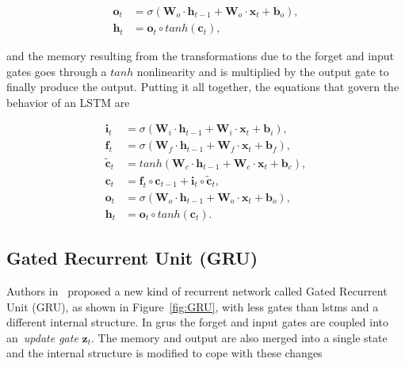 \begin{equation}\label{eq:LSTM_output_gate}
\begin{split}
\mathbf{o}_t &= \sigma\left(\mathbf{W}_o \cdot \mathbf{h}_{t-1} +
\mathbf{W}_o \cdot \mathbf{x}_t + \mathbf{b}_o \right),\\
\mathbf{h}_t &= \mathbf{o}_t \circ tanh \left(\mathbf{c}_t\right),
\end{split}
\end{equation}

and the memory resulting from the transformations due to the forget and input gates goes through a $tanh$ nonlinearity and is multiplied by the output gate to finally produce the output. Putting it all together, the equations that govern the behavior of an LSTM are

\begin{equation}\label{eq:LSTM}
\begin{split}
\mathbf{i}_t &= \sigma\left(\mathbf{W}_i \cdot \mathbf{h}_{t-1} +
\mathbf{W}_i \cdot \mathbf{x}_t + \mathbf{b}_i \right),\\
\mathbf{f}_t &= \sigma\left(\mathbf{W}_f \cdot \mathbf{h}_{t-1} +
\mathbf{W}_f \cdot \mathbf{x}_t + \mathbf{b}_f \right),\\
\mathbf{\tilde c}_t &= tanh \left(\mathbf{W}_c \cdot \mathbf{h}_{t-1} +
\mathbf{W}_c \cdot \mathbf{x}_t + \mathbf{b}_c \right),\\
\mathbf{c}_t &= \mathbf{f}_t \circ \mathbf{c}_{t-1} + \mathbf{i}_t
\circ \mathbf{\tilde c}_t,\\
\mathbf{o}_t &= \sigma\left(\mathbf{W}_o \cdot \mathbf{h}_{t-1} +
\mathbf{W}_o \cdot \mathbf{x}_t + \mathbf{b}_o \right),\\
\mathbf{h}_t &= \mathbf{o}_t \circ tanh \left(\mathbf{c}_t\right).
\end{split}
\end{equation}




\subsection{Gated Recurrent Unit (GRU)}\label{sec:GRU}
Authors in~\cite{Cho_14} proposed a new kind of recurrent network called Gated Recurrent Unit (GRU), as shown in Figure~\ref{fig:GRU}, with less gates than \gls{lstm}s and a different internal structure. In \gls{gru}s the forget and input gates are coupled into an~\emph{update gate} $\mathbf{z}_t$.  The memory and output are also merged into a single state and the internal structure is modified to cope with these changes

